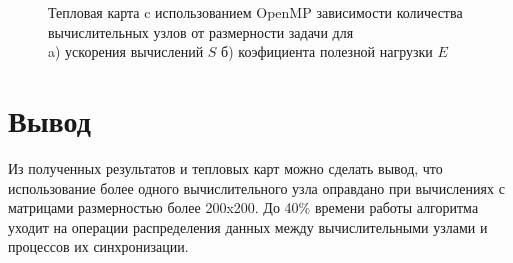 \begin{figure}[H]
    \centering
    \begin{minipage}[h]{0.49\textwidth}
    \end{minipage}
    \hfill
    \begin{minipage}[h]{0.49\textwidth}
    \end{minipage}
    \caption{Тепловая карта c использованием OpenMP зависимости количества вычислительных узлов от размерности задачи для \\ a) ускорения вычислений  $S$  б) коэфициента полезной нагрузки  $E$   }
    \label{fig:heatmap_s2}
\end{figure}
    


\section*{Вывод}

Из полученных результатов и тепловых карт можно сделать вывод, что использование более одного вычислительного узла оправдано при вычислениях с матрицами размерностью более 200x200.
До 40\% времени работы алгоритма уходит на операции распределения данных между вычислительными узлами и процессов их синхронизации.


